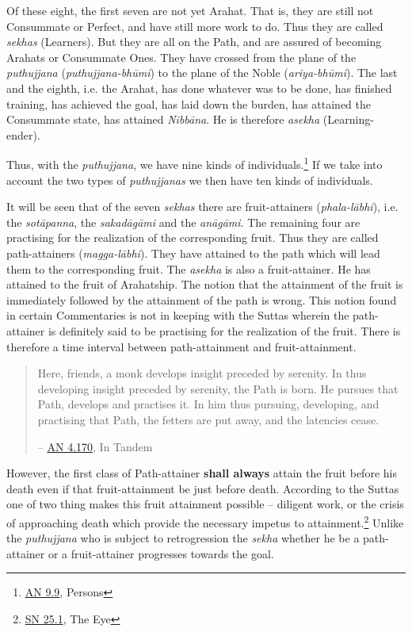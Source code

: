 Of these eight, the first seven are not yet Arahat. That is, they are still not Consummate or Perfect, and have still more work to do. Thus they are called \emph{sekhas} (Learners). But they are all on the Path, and are assured of becoming Arahats or Consummate Ones. They have crossed from the plane of the \emph{puthujjana} (\emph{puthujjana-bhūmi}) to the plane of the Noble (\emph{ariya-bhūmi}). The last and the eighth, i.e. the Arahat, has done whatever was to be done, has finished training, has achieved the goal, has laid down the burden, has attained the Consummate state, has attained \emph{Nibbāna}. He is therefore \emph{asekha} (Learning-ender).

Thus, with the \emph{puthujjana}, we have nine kinds of individuals.\footnote{\href{https://suttacentral.net/an9.9/en/sujato}{AN 9.9}, Persons} If we take into account the two types of \emph{puthujjanas} we then have ten kinds of individuals.

It will be seen that of the seven \emph{sekhas} there are fruit-attainers (\emph{phala-lābhi}), i.e. the \emph{sotāpanna}, the \emph{sakadāgāmi} and the \emph{anāgāmi}. The remaining four are practising for the realization of the corresponding fruit. Thus they are called path-attainers (\emph{magga-lābhi}). They have attained to the path which will lead them to the corresponding fruit. The \emph{asekha} is also a fruit-attainer. He has attained to the fruit of Arahatship. The notion that the attainment of the fruit is immediately followed by the attainment of the path is wrong. This notion found in certain Commentaries is not in keeping with the Suttas wherein the path-attainer is definitely said to be practising for the realization of the fruit. There is therefore a time interval between path-attainment and fruit-attainment.

\begin{quote}
Here, friends, a monk develops insight preceded by serenity. In thus developing insight preceded by serenity, the Path is born. He pursues that Path, develops and practises it. In him thus pursuing, developing, and practising that Path, the fetters are put away, and the latencies cease.

 -- \href{https://suttacentral.net/an4.170/en/thanissaro}{AN 4.170}, In Tandem
\end{quote}

However, the first class of Path-attainer \textbf{shall always} attain the fruit before his death even if that fruit-attainment be just before death. According to the Suttas one of two thing makes this fruit attainment possible -- diligent work, or the crisis of approaching death which provide the necessary impetus to attainment.\footnote{\href{https://suttacentral.net/sn25.1/en/sujato}{SN 25.1}, The Eye} Unlike the \emph{puthujjana} who is subject to retrogression the \emph{sekha} whether he be a path-attainer or a fruit-attainer progresses towards the goal.

